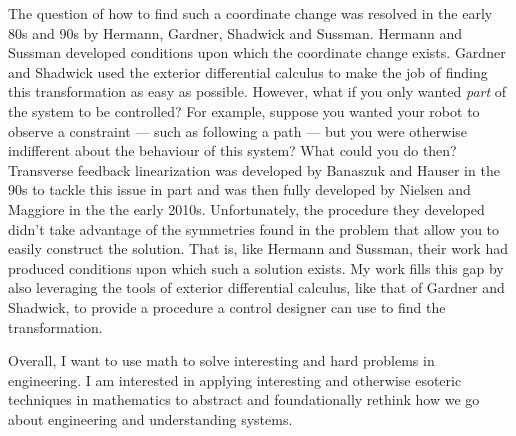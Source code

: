 The question of how to find such a coordinate change was resolved in the early 80s and 90s by Hermann, Gardner, Shadwick and Sussman.
Hermann and Sussman developed conditions upon which the coordinate change exists.
Gardner and Shadwick used the exterior differential calculus to make the job of finding this transformation as easy as possible.
However, what if you only wanted \emph{part} of the system to be controlled?
For example, suppose you wanted your robot to observe a constraint --- such as following a path --- but you were otherwise indifferent about the behaviour of this system?
What could you do then?
Transverse feedback linearization was developed by Banaszuk and Hauser in the 90s to tackle this issue in part and was then fully developed by Nielsen and Maggiore in the the early 2010s.
Unfortunately, the procedure they developed didn't take advantage of the symmetries found in the problem that allow you to easily construct the solution.
That is, like Hermann and Sussman, their work had produced conditions upon which such a solution exists.
My work fills this gap by also leveraging the tools of exterior differential calculus, like that of Gardner and Shadwick, to provide a procedure a control designer can use to find the transformation.

Overall, I want to use math to solve interesting and hard problems in engineering.
I am interested in applying interesting and otherwise esoteric techniques in mathematics to abstract and foundationally rethink how we go about engineering and understanding systems.